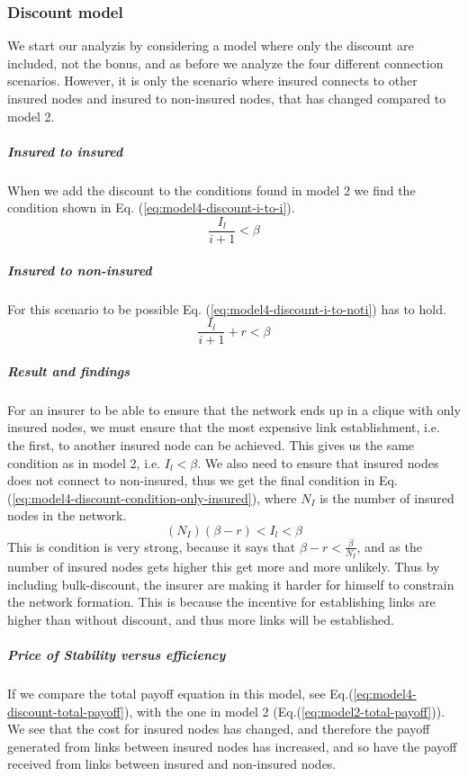 \subsubsection{Discount model}
We start our analyzis by considering a model where only the discount are included, not the bonus, and as before we analyze the four different connection scenarios. However, it is only the scenario where insured connects to other insured nodes and insured to non-insured nodes, that has changed compared to model 2.
\subparagraph{Insured to insured}
When we add the discount to the conditions found in model 2 we find the condition shown in Eq. (\ref{eq:model4-discount-i-to-i}).
\begin{equation}
\frac{I_{l}}{i+1}<\beta
\label{eq:model4-discount-i-to-i}
\end{equation}
\subparagraph{Insured to non-insured}
For this scenario to be possible Eq. (\ref{eq:model4-discount-i-to-noti}) has to hold.
\begin{equation}
\frac{I_{l}}{i+1}+r<\beta
\label{eq:model4-discount-i-to-noti}
\end{equation}
\subparagraph{Result and findings}
For an insurer to be able to ensure that the network ends up in a clique with only insured nodes, we must ensure that the most expensive link establishment, i.e. the first, to another insured node can be achieved. This gives us the same condition as in model 2, i.e. $I_{l}<\beta$. 
We also need to ensure that insured nodes does not connect to non-insured, thus we get the final condition in Eq. (\ref{eq:model4-discount-condition-only-insured}), where $N_{I}$ is the number of insured nodes in the network.
\begin{equation}
(N_{I})(\beta-r)<I_{l}<\beta
\label{eq:model4-discount-condition-only-insured}
\end{equation}
This is condition is very strong, because it says that $\beta-r<\frac{\beta}{N_{I}}$, and as the number of insured nodes gets higher this get more and more unlikely. 
Thus by including bulk-discount, the insurer are making it harder for himself to constrain the network formation. This is because the incentive for establishing links are higher than without discount, and thus more links will be established.
\subparagraph{Price of Stability versus efficiency}
If we compare the total payoff equation in this model, see Eq.(\ref{eq:model4-discount-total-payoff}), with the one in model 2 (Eq.(\ref{eq:model2-total-payoff})). We see that the cost for insured nodes has changed, and therefore the payoff generated from links between insured nodes has increased, and so have the payoff received from links between insured and non-insured nodes. 
